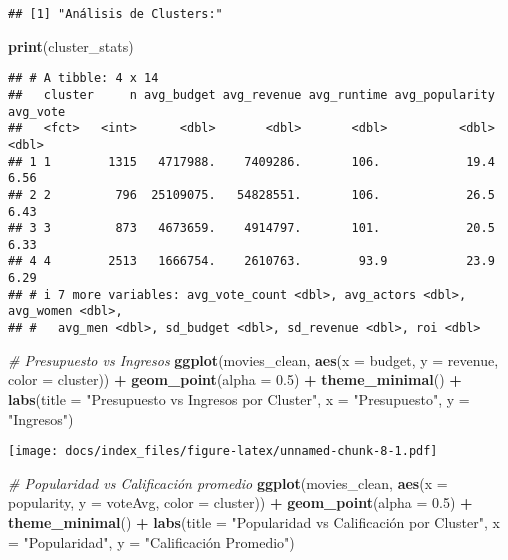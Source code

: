 \documentclass[
]{article}
\newenvironment{Shaded}{\begin{snugshade}}{\end{snugshade}}
\newcommand{\AttributeTok}[1]{\textcolor[rgb]{0.13,0.29,0.53}{#1}}
\newcommand{\CommentTok}[1]{\textcolor[rgb]{0.56,0.35,0.01}{\textit{#1}}}
\newcommand{\FloatTok}[1]{\textcolor[rgb]{0.00,0.00,0.81}{#1}}
\newcommand{\FunctionTok}[1]{\textcolor[rgb]{0.13,0.29,0.53}{\textbf{#1}}}
\newcommand{\NormalTok}[1]{#1}
\newcommand{\SpecialCharTok}[1]{\textcolor[rgb]{0.81,0.36,0.00}{\textbf{#1}}}
\newcommand{\StringTok}[1]{\textcolor[rgb]{0.31,0.60,0.02}{#1}}
\begin{document}
\begin{verbatim}
## [1] "Análisis de Clusters:"
\end{verbatim}

\begin{Shaded}
\begin{Highlighting}[]
\FunctionTok{print}\NormalTok{(cluster\_stats)}
\end{Highlighting}
\end{Shaded}

\begin{verbatim}
## # A tibble: 4 x 14
##   cluster     n avg_budget avg_revenue avg_runtime avg_popularity avg_vote
##   <fct>   <int>      <dbl>       <dbl>       <dbl>          <dbl>    <dbl>
## 1 1        1315   4717988.    7409286.       106.            19.4     6.56
## 2 2         796  25109075.   54828551.       106.            26.5     6.43
## 3 3         873   4673659.    4914797.       101.            20.5     6.33
## 4 4        2513   1666754.    2610763.        93.9           23.9     6.29
## # i 7 more variables: avg_vote_count <dbl>, avg_actors <dbl>, avg_women <dbl>,
## #   avg_men <dbl>, sd_budget <dbl>, sd_revenue <dbl>, roi <dbl>
\end{verbatim}

\begin{Shaded}
\begin{Highlighting}[]
\CommentTok{\# Presupuesto vs Ingresos}
\FunctionTok{ggplot}\NormalTok{(movies\_clean, }\FunctionTok{aes}\NormalTok{(}\AttributeTok{x =}\NormalTok{ budget, }\AttributeTok{y =}\NormalTok{ revenue, }\AttributeTok{color =}\NormalTok{ cluster)) }\SpecialCharTok{+}
  \FunctionTok{geom\_point}\NormalTok{(}\AttributeTok{alpha =} \FloatTok{0.5}\NormalTok{) }\SpecialCharTok{+}
  \FunctionTok{theme\_minimal}\NormalTok{() }\SpecialCharTok{+}
  \FunctionTok{labs}\NormalTok{(}\AttributeTok{title =} \StringTok{"Presupuesto vs Ingresos por Cluster"}\NormalTok{,}
       \AttributeTok{x =} \StringTok{"Presupuesto"}\NormalTok{,}
       \AttributeTok{y =} \StringTok{"Ingresos"}\NormalTok{)}
\end{Highlighting}
\end{Shaded}

\texttt{[image: docs/index\_files/figure-latex/unnamed-chunk-8-1.pdf]}

\begin{Shaded}
\begin{Highlighting}[]
\CommentTok{\# Popularidad vs Calificación promedio}
\FunctionTok{ggplot}\NormalTok{(movies\_clean, }\FunctionTok{aes}\NormalTok{(}\AttributeTok{x =}\NormalTok{ popularity, }\AttributeTok{y =}\NormalTok{ voteAvg, }\AttributeTok{color =}\NormalTok{ cluster)) }\SpecialCharTok{+}
  \FunctionTok{geom\_point}\NormalTok{(}\AttributeTok{alpha =} \FloatTok{0.5}\NormalTok{) }\SpecialCharTok{+}
  \FunctionTok{theme\_minimal}\NormalTok{() }\SpecialCharTok{+}
  \FunctionTok{labs}\NormalTok{(}\AttributeTok{title =} \StringTok{"Popularidad vs Calificación por Cluster"}\NormalTok{,}
       \AttributeTok{x =} \StringTok{"Popularidad"}\NormalTok{,}
       \AttributeTok{y =} \StringTok{"Calificación Promedio"}\NormalTok{)}
\end{Highlighting}
\end{Shaded}
\end{document}
